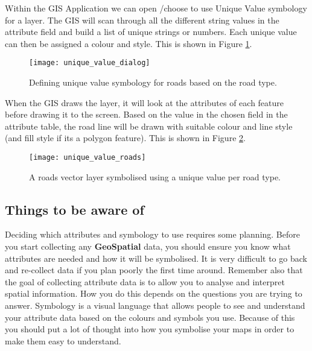 Within the GIS Application we can open /choose to use Unique Value symbology
for a layer. The GIS will scan through all the different string values in the
attribute field and build a list of unique strings or numbers. Each unique
value can then be assigned a colour and style. This is shown in Figure
\ref{fig:univaldialog}.

\begin{figure}[ht]
   \begin{center}
   \caption{Defining unique value symbology for roads based on the road type.}
\label{fig:univaldialog}\smallskip
   \texttt{[image: unique\_value\_dialog]}
\end{center}
\end{figure}

When the GIS draws the layer, it will look at the attributes of each feature
before drawing it to the screen. Based on the value in the chosen field in
the attribute table, the road line will be drawn with suitable colour and
line style (and fill style if its a polygon feature). This is shown in
Figure \ref{fig:uniroads}.

\begin{figure}[ht]
   \begin{center}
   \caption{A roads vector layer symbolised using a unique value per road
type.}
\label{fig:uniroads}\smallskip
   \texttt{[image: unique\_value\_roads]}
\end{center}
\end{figure}

\subsection{Things to be aware of}

Deciding which attributes and symbology to use requires some planning. Before
you start collecting any \textbf{GeoSpatial} data, you should ensure you know what
attributes are needed and how it will be symbolised. It is very difficult to
go back and re-collect data if you plan poorly the first time around.
Remember also that the goal of collecting attribute data is to allow you to
analyse and interpret spatial information. How you do this depends on the
questions you are trying to answer. Symbology is a visual language that
allows people to see and understand your attribute data based on the colours
and symbols you use. Because of this you should put a lot of thought into how
you symbolise your maps in order to make them easy to understand.


